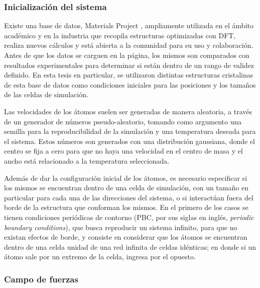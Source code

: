 \subsubsection{Inicialización del sistema}

Existe una base de datos, Materials Project \cite{materials_project}, 
ampliamente utilizada en el ámbito académico y en la industria que 
recopila estructuras optimizadas con DFT, realiza nuevos cálculos y 
está abierta a la comunidad para su uso y colaboración. Antes de que 
los datos se carguen en la página, los mismos son comparados con resultados 
experimentales para determinar si están dentro de un rango de validez definido. 
En esta tesis en particular, se utilizaron distintas estructuras cristalinas de 
esta base de datos como condiciones iniciales para las posiciones y los tamaños 
de las celdas de simulación.

Las velocidades de los átomos suelen ser generadas de manera aleatoria, a través
de un generador de números pseudo-aleatorio, tomando como argumento una semilla 
para la reproducibilidad de la simulación y una temperatura deseada para el
sistema. Estos números son generados con una distribución gaussiana, donde el 
centro se fija a cero para que no haya una velocidad en el centro de masa y 
el ancho está relacionado a la temperatura seleccionada.

Además de dar la configuración inicial de los átomos, es necesario especificar si
los mismos se encuentran dentro de una celda de simulación, con un tamaño en
particular para cada una de las direcciones del sistema, o si
interactúan fuera
del borde de la estructura que conforman los mismos. En el primero de los casos
se tienen condiciones periódicas de contorno (PBC, por sus siglas en inglés, 
\textit{periodic boundary conditions}), que busca reproducir un sistema infinito,
para que no existan efectos de borde, y consiste en considerar que los átomos se 
encuentran dentro de una celda unidad de una red infinita de celdas idénticas; en
donde si un átomo sale por un extremo de la celda, ingresa por el opuesto.


\subsubsection{Campo de fuerzas}

